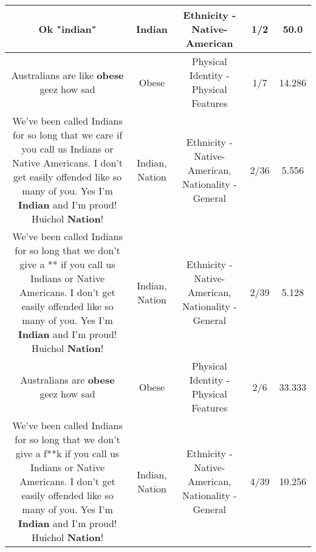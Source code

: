 \documentclass[11pt]{article}
\newlength\mylength
\begin{document}
\begin{center}
\begin{longtable}{|C{.65\mylength}|C{.30\mylength}|C{.12\mylength}|C{.12\mylength}|C{.12\mylength}|}
  \small Ok "\textbf{indian}"\normalsize   & Indian & Ethnicity - Native-American & 1/2 & 50.0 \\  \hline
  \small Australians are like \textbf{obese} geez how sad\normalsize   & Obese & Physical Identity - Physical Features & 1/7 & 14.286 \\  \hline
  \small We've been called Indians for so long that we care if you call us Indians or Native Americans. I don't get easily offended like so many of you. Yes I'm \textbf{Indian} and I'm proud! Huichol \textbf{Nation}!\normalsize   & Indian, Nation & Ethnicity - Native-American, Nationality - General & 2/36 & 5.556 \\  \hline
  \small We've been called Indians for so long that we don't give a ** if you call us Indians or Native Americans. I don't get easily offended like so many of you. Yes I'm \textbf{Indian} and I'm proud! Huichol \textbf{Nation}!\normalsize   & Indian, Nation & Ethnicity - Native-American, Nationality - General & 2/39 & 5.128 \\  \hline
  \small Australians are \textbf{obese} geez how sad\normalsize   & Obese & Physical Identity - Physical Features & 2/6 & 33.333 \\  \hline
  \small We've been called Indians for so long that we don't give a f**k if you call us Indians or Native Americans. I don't get easily offended like so many of you. Yes I'm \textbf{Indian} and I'm proud! Huichol \textbf{Nation}!\normalsize   & Indian, Nation & Ethnicity - Native-American, Nationality - General & 4/39 & 10.256 \\  \hline

\end{longtable}
\end{center}
\end{document}
